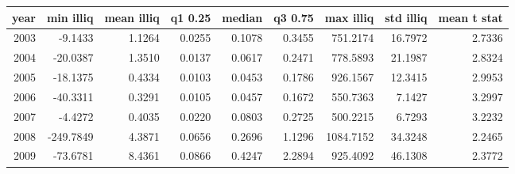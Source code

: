 \begin{tabular}{rrrrrrrrr}
\toprule
year & min illiq & mean illiq & q1 0.25 & median & q3 0.75 & max illiq & std illiq & mean t stat \\
\midrule
2003 & -9.1433 & 1.1264 & 0.0255 & 0.1078 & 0.3455 & 751.2174 & 16.7972 & 2.7336 \\
2004 & -20.0387 & 1.3510 & 0.0137 & 0.0617 & 0.2471 & 778.5893 & 21.1987 & 2.8324 \\
2005 & -18.1375 & 0.4334 & 0.0103 & 0.0453 & 0.1786 & 926.1567 & 12.3415 & 2.9953 \\
2006 & -40.3311 & 0.3291 & 0.0105 & 0.0457 & 0.1672 & 550.7363 & 7.1427 & 3.2997 \\
2007 & -4.4272 & 0.4035 & 0.0220 & 0.0803 & 0.2725 & 500.2215 & 6.7293 & 3.2232 \\
2008 & -249.7849 & 4.3871 & 0.0656 & 0.2696 & 1.1296 & 1084.7152 & 34.3248 & 2.2465 \\
2009 & -73.6781 & 8.4361 & 0.0866 & 0.4247 & 2.2894 & 925.4092 & 46.1308 & 2.3772 \\
\bottomrule
\end{tabular}
